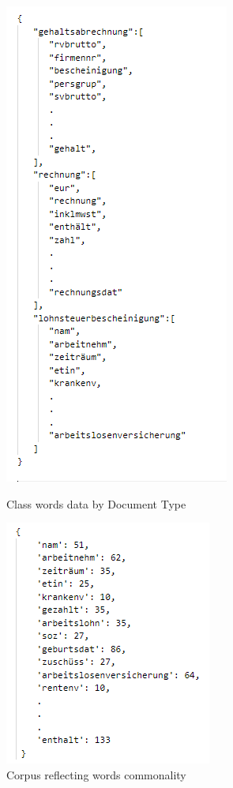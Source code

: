 \begin{figure}[H]
  \centering
  \begin{minipage}[b]{0.4\textwidth}
    \includegraphics[scale=0.9]{images/Chapter5/sol_1/class_words.png}
    \caption{Class words data by Document Type}
    \label{class_words}
  \end{minipage}
  \hfill
  \begin{minipage}[b]{0.4\textwidth}
    \includegraphics[scale=0.9]{images/Chapter5/sol_1/corpus_words.png}
    \caption{Corpus reflecting words commonality}
    \label{corpus}
  \end{minipage}
\end{figure}


